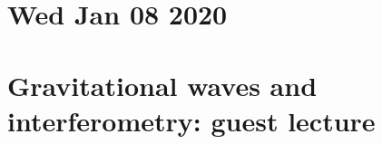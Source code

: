 \documentclass[main.tex]{subfiles}
\begin{document}
\section*{Wed Jan 08 2020}

\section{Gravitational waves and interferometry: guest lecture}
\end{document}
